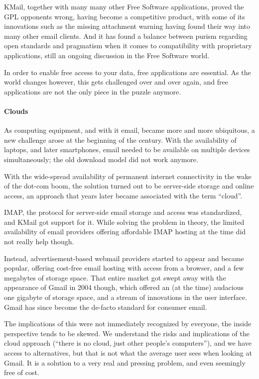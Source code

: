 KMail, together with many many other Free Software applications, proved the GPL opponents wrong, having become a competitive product, with some of its innovations such as the missing attachment warning having found their way into many other email clients. And it has found a balance between purism regarding open standards and pragmatism when it comes to compatibility with proprietary applications, still an ongoing discussion in the Free Software world.

In order to enable free access to your data, free applications are essential. As the world changes however, this gets challenged over and over again, and free applications are not the only piece in the puzzle anymore.

\paragraph{Clouds}

As computing equipment, and with it email, became more and more ubiquitous, a new challenge arose at the beginning of the century. With the availability of laptops, and later smartphones, email needed to be available on multiple devices simultaneously; the old download model did not work anymore.

With the wide-spread availability of permanent internet connectivity in the wake of the dot-com boom, the solution turned out to be server-side storage and online access, an approach that years later became associated with the term “cloud”.

IMAP, the protocol for server-side email storage and access was standardized, and KMail got support for it. While solving the problem in theory, the limited availability of email providers offering affordable IMAP hosting at the time did not really help though.

Instead, advertisement-based webmail providers started to appear and became popular, offering cost-free email hosting with access from a browser, and a few megabytes of storage space. That entire market got swept away with the appearance of Gmail in 2004 though, which offered an (at the time) audacious one gigabyte of storage space, and a stream of innovations in the user interface. Gmail has since become the de-facto standard for consumer email.

The implications of this were not immediately recognized by everyone, the inside perspective tends to be skewed. We understand the risks and implications of the cloud approach (“there is no cloud, just other people's computers”), and we have access to alternatives, but that is not what the average user sees when looking at Gmail. It is a solution to a very real and pressing problem, and even seemingly free of cost.

